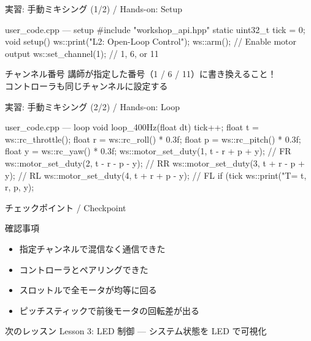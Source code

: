 \begin{frame}[fragile]{実習: 手動ミキシング (1/2) / Hands-on: Setup}
  \begin{sflisting}{user\_code.cpp --- setup}
#include "workshop_api.hpp"
static uint32_t tick = 0;
void setup() {
    ws::print("L2: Open-Loop Control");
    ws::arm();              // Enable motor output
    ws::set_channel(1);     // 1, 6, or 11
}
  \end{sflisting}

  \vspace{0.3em}
  \begin{alertblock}{チャンネル番号}
    講師が指定した番号（1 / 6 / 11）に書き換えること！\\
    コントローラも同じチャンネルに設定する
  \end{alertblock}
\end{frame}

\begin{frame}[fragile]{実習: 手動ミキシング (2/2) / Hands-on: Loop}
  \begin{sflisting}{user\_code.cpp --- loop}
void loop_400Hz(float dt) {
    tick++;
    float t = ws::rc_throttle();
    float r = ws::rc_roll()  * 0.3f;
    float p = ws::rc_pitch() * 0.3f;
    float y = ws::rc_yaw()   * 0.3f;
    ws::motor_set_duty(1, t - r + p + y); // FR
    ws::motor_set_duty(2, t - r - p - y); // RR
    ws::motor_set_duty(3, t + r - p + y); // RL
    ws::motor_set_duty(4, t + r + p - y); // FL
    if (tick %
        ws::print("T=%
            t, r, p, y);
}
  \end{sflisting}
\end{frame}

\begin{frame}{チェックポイント / Checkpoint}
  \begin{alertblock}{確認事項}
    \begin{itemize}
      \item[$\square$] 指定チャンネルで混信なく通信できた
      \item[$\square$] コントローラとペアリングできた
      \item[$\square$] スロットルで全モータが均等に回る
      \item[$\square$] ピッチスティックで前後モータの回転差が出る
    \end{itemize}
  \end{alertblock}

  \vspace{1em}

  \begin{block}{次のレッスン}
    Lesson 3: LED 制御 --- システム状態を LED で可視化
  \end{block}
\end{frame}
